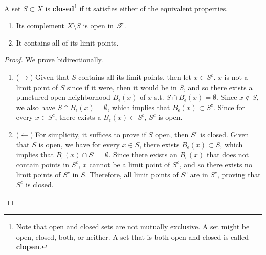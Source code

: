   \begin{definition}
    A set $S \subset X$ is \textbf{closed}\footnote{Note that open and closed sets are not mutually exclusive. A set might be open, closed, both, or neither. A set that is both open and closed is called \textbf{clopen}.} if it satisfies either of the equivalent properties. 
    \begin{enumerate}
      \item Its complement $X \setminus S$ is open in $\T$. 
      \item It contains all of its limit points. 
    \end{enumerate}
  \end{definition}
  \begin{proof}
    We prove bidirectionally. 
    \begin{enumerate}
      \item ($\rightarrow$) Given that $S$ contains all its limit points, then let $x \in S^c$. $x$ is not a limit point of $S$ since if it were, then it would be in $S$, and so there exists a punctured open neighborhood $B_\epsilon^\circ (x)$ of $x$ s.t. $S \cap B_\epsilon^\circ (x) = \emptyset$. Since $x \not\in S$, we also have $S \cap B_\epsilon (x) = \emptyset$, which implies that $B_\epsilon (x) \subset S^c$. Since for every $x \in S^c$, there exists a $B_\epsilon (x) \subset S^c$, $S^c$ is open. 

      \item ($\leftarrow$) For simplicity, it suffices to prove if $S$ open, then $S^c$ is closed. Given that $S$ is open, we have for every $x \in S$, there exists $B_\epsilon (x) \subset S$, which implies that $B_\epsilon (x) \cap S^c = \emptyset$. Since there exists an $B_\epsilon (x)$ that does not contain points in $S^c$, $x$ cannot be a limit point of $S^c$, and so there exists no limit points of $S^c$ in $S$. Therefore, all limit points of $S^c$ are in $S^c$, proving that $S^c$ is closed.  
    \end{enumerate}
  \end{proof}
  
